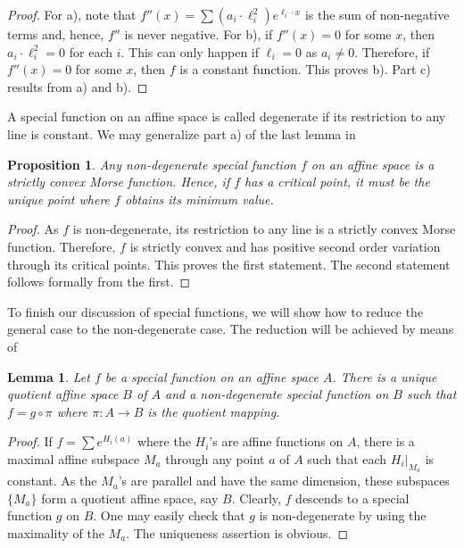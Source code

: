 \documentclass[11pt]{article}
\theoremstyle{plain}
\newtheorem{lem}{Lemma}
\newtheorem{prop}{Proposition}
\begin{document}
\begin{proof}
For a), note that $f''(x)=\sum (a_i\cdot\ell_i^{2})e^{\ell_i\cdot x}$ is the sum
of non-negative terms and, hence, $f''$ is never negative. For b), if
$f''(x)=0$ for some $x$, then $a_i\cdot\ell_i^{2}=0$ for each $i$. This can only
happen if $\ell_i=0$ as $a_i\neq 0$. Therefore, if $f''(x)=0$ for some $x$, then
$f$ is a constant function. This proves b). Part c) results from a) and b).
\end{proof}

A special function on an affine space is called degenerate if its restriction to
any line is constant. We may generalize part a) of the last lemma in

\renewcommand{\theprop}{1.2}
\begin{prop}
Any non-degenerate special function $f$ on an affine space is a strictly convex
Morse function. Hence, if $f$ has a critical point, it must be the unique point
where $f$ obtains its minimum value.
\end{prop}

\begin{proof}
As $f$ is non-degenerate, its restriction to any line is a strictly convex Morse
function. Therefore, $f$ is strictly convex and has positive second order
variation through its critical points. This proves the first statement. The
second statement follows formally from the first.
\end{proof}

To finish our discussion of special functions, we will show how to reduce the
general case to the non-degenerate case. The reduction will be achieved by means
of

\renewcommand{\thelem}{1.3}
\begin{lem}
Let $f$ be a special function on an affine space $A$. There is a unique quotient
affine space $B$ of $A$ and a non-degenerate special function on $B$ such that
$f=g\circ\pi$ where $\pi:A\to B$ is the quotient mapping.
\end{lem}

\begin{proof}
If $f=\sum e^{H_i(a)}$ where the $H_i$'s are affine functions on $A$, there is a
maximal affine subspace $M_a$ through any point $a$ of $A$ such that each
$H_i|_{M_a}$ is constant. As the $M_a$'s are parallel and have the same
dimension, these subspaces $\{M_a\}$ form a quotient affine space, say $B$.
Clearly, $f$ descends to a special function $g$ on $B$. One may easily check that
$g$ is non-degenerate by using the maximality of the $M_a$. The uniqueness
assertion is obvious.
\end{proof}
\end{document}
